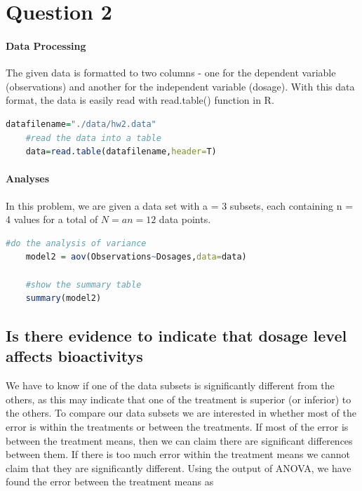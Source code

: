 \documentclass[11pt]{article}
\begin{document}
\clearpage
\section{Question 2}

\paragraph{Data Processing}
The given data is formatted to two columns - one for the dependent variable (observations) and another for the independent variable (dosage). With this data format, the data is easily read with read.table() function in R.

\begin{lstlisting}[language=R]
    datafilename="./data/hw2.data"
    #read the data into a table
    data=read.table(datafilename,header=T)
\end{lstlisting}


\paragraph{Analyses}
In this problem, we are given a data set with a = 3 subsets, each containing n = 4 values for a total of $\displaystyle N=an=12$ data points. 

\begin{lstlisting}[language=R]
    #do the analysis of variance
    model2 = aov(Observations~Dosages,data=data)

    #show the summary table
    summary(model2)
\end{lstlisting}



\subsection{Is there evidence to indicate that dosage level affects bioactivitys}
We have to know if one of the data subsets is significantly different from the others, as this may indicate that one of the treatment is superior (or inferior) to the others. To compare our data subsets we are interested in whether most of the error is within the treatments or between the treatments. If most of the error is between the treatment means, then we can claim there are significant differences between them. If there is too much error within the treatment means we cannot claim that they are significantly different. Using the output of ANOVA, we have found the error between the treatment means as 
\end{document}
